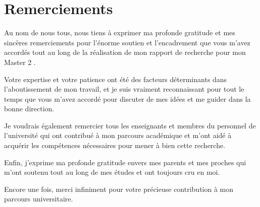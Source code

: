 \chapter*{Remerciements}

Au nom de nous tous, nous tiens à exprimer ma profonde gratitude et mes sincères remerciements pour l'énorme soutien et l'encadrement que vous m'avez accordés tout au long de la réalisation de mon rapport de recherche pour mon Master 2 .

Votre expertise et votre patience ont été des facteurs déterminants dans l'aboutissement de mon travail, et je suis vraiment reconnaissant pour tout le temps que vous m'avez accordé pour discuter de mes idées et me guider dans la bonne direction.

Je voudrais également remercier tous les enseignants et membres du personnel de l'université qui ont contribué à mon parcours académique et m'ont aidé à acquérir les compétences nécessaires pour mener à bien cette recherche.

Enfin, j'exprime ma profonde gratitude envers mes parents et mes proches qui m'ont soutenu tout au long de mes études et ont toujours cru en moi.

Encore une fois, merci infiniment pour votre précieuse contribution à mon parcours universitaire.




